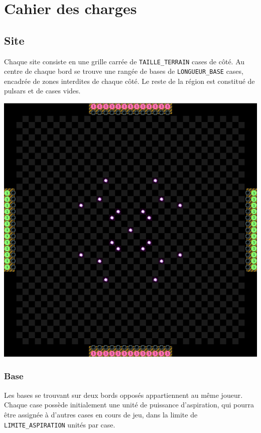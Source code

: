 \section{Cahier des charges}\label{cahier-des-charges}

\subsection{Site}\label{site}

Chaque site consiste en une grille carrée de \texttt{TAILLE\_TERRAIN}
cases de côté. Au centre de chaque bord se trouve une rangée de bases de
\texttt{LONGUEUR\_BASE} cases, encadrée de zones interdites de chaque
côté. Le reste de la région est constitué de pulsars et de cases vides.

\includegraphics{../subject/slides/pictures/map.png}

\subsubsection{Base}\label{base}

Les bases se trouvant sur deux bords opposés appartiennent au même
joueur. Chaque case possède initialement une unité de puissance
d'aspiration, qui pourra être assignée à d'autres cases en cours de jeu,
dans la limite de \texttt{LIMITE\_ASPIRATION} unités par case.

